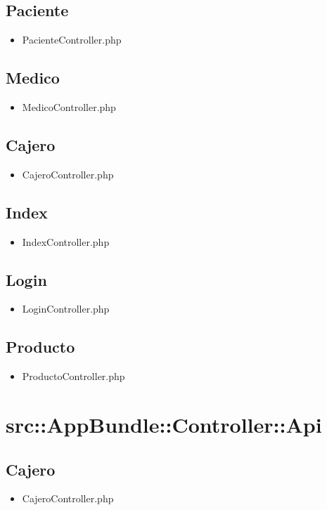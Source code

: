 	\subsection{Paciente}
	\begin{itemize}
		\item PacienteController.php
	\end{itemize}
	\subsection{Medico}
	\begin{itemize}
		\item MedicoController.php
	\end{itemize}
	\subsection{Cajero}
	\begin{itemize}
		\item CajeroController.php
	\end{itemize}
	\subsection{Index}
	\begin{itemize}
		\item IndexController.php
	\end{itemize}
	\subsection{Login}
	\begin{itemize}
		\item LoginController.php
	\end{itemize}
	\subsection{Producto}
	\begin{itemize}
		\item ProductoController.php
	\end{itemize}
	\section{src::AppBundle::Controller::Api}
		\subsection{Cajero}
		\begin{itemize}
		\item CajeroController.php
		\end{itemize}
